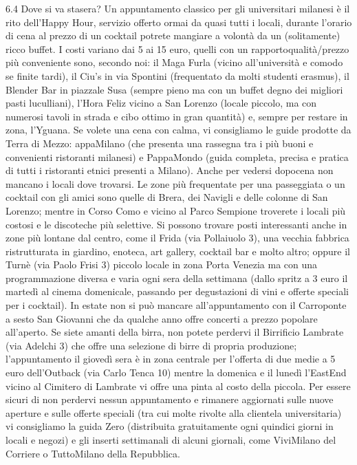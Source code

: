 6.4 Dove si va stasera?
Un appuntamento classico per gli universitari milanesi è il rito dell'Happy Hour,  servizio offerto ormai da quasi tutti i locali, durante l'orario di cena al prezzo di un cocktail potrete mangiare a volontà da un (solitamente) ricco buffet. I costi variano dai 5 ai 15 euro, quelli con un rapportoqualità/prezzo più conveniente sono, secondo noi: il Maga Furla (vicino all'università e comodo se finite tardi), il Ciu's in via Spontini (frequentato da molti studenti erasmus), il Blender Bar in piazzale Susa (sempre pieno ma con un buffet degno dei migliori pasti luculliani), l'Hora Feliz vicino a San Lorenzo (locale piccolo, ma con numerosi tavoli in strada e cibo ottimo in gran quantità) e, sempre per restare in zona, l'Yguana. Se volete una cena con calma, vi consigliamo le guide prodotte da Terra di Mezzo: appaMilano (che presenta una rassegna tra i più buoni e convenienti ristoranti milanesi) e PappaMondo (guida completa, precisa e pratica di tutti i ristoranti etnici presenti a Milano).
Anche per vedersi dopocena non mancano i locali dove trovarsi. Le zone più frequentate per una passeggiata o un cocktail con gli amici sono quelle di Brera, dei Navigli e delle colonne di San Lorenzo; mentre in Corso Como e vicino al Parco Sempione troverete i locali più costosi e le discoteche più selettive. Si possono trovare posti interessanti anche in zone più lontane dal centro, come il Frida (via Pollaiuolo 3), una vecchia fabbrica ristrutturata in giardino, enoteca, art gallery, cocktail bar e molto altro; oppure il Turnè (via Paolo Frisi 3) piccolo locale in zona Porta Venezia ma con una programmazione diversa e varia ogni sera della settimana (dallo spritz a 3 euro il martedì al cinema domenicale, passando per degustazioni di vini e offerte speciali per i cocktail). In estate non si può mancare all'appuntamento con il Carroponte a sesto San Giovanni che da qualche anno offre concerti a prezzo popolare all'aperto. 
Se siete amanti della birra, non potete perdervi il Birrificio Lambrate (via Adelchi 3) che offre una selezione di birre di propria produzione; l'appuntamento il giovedì sera è in zona centrale per l'offerta di due medie a 5 euro dell'Outback (via Carlo Tenca 10) mentre la domenica e il lunedì l'EastEnd vicino al Cimitero di Lambrate vi offre una pinta al costo della piccola. Per essere sicuri di non perdervi nessun appuntamento e rimanere aggiornati sulle nuove aperture e sulle offerte speciali (tra cui molte rivolte alla clientela universitaria) vi consigliamo la guida Zero (distribuita gratuitamente ogni quindici giorni in locali e negozi) e gli inserti settimanali di alcuni giornali, come ViviMilano del Corriere o TuttoMilano della Repubblica. 

